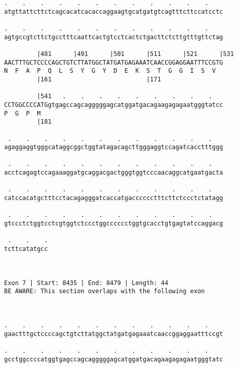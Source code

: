 \documentclass{article}
\begin{document}
\begin{Verbatim}
.    .    .    .    .    .    .    .    .    .    .    .    
atgttattcttctcagcacatcacaccaggaagtgcatgatgtcagtttcttccatcctc
                                                            
.    .    .    .    .    .    .    .    .    .    .    .    
agtgccgtcttctgcctttcaattcactgtcctcactctgacttctcttgtttgttctag
                                                            
         |481      |491      |501      |511      |521      |531
AACTTTGCTCCCCAGCTGTCTTATGGCTATGATGAGAAATCAACCGGAGGAATTTCCGTG
N  F  A  P  Q  L  S  Y  G  Y  D  E  K  S  T  G  G  I  S  V  
         |161                          |171                 
  
         |541   .    .    .    .    .    .    .    .    .   
CCTGGCCCCATGgtgagccagcagggggagcatggatgacagaagagagaatgggtatcc
P  G  P  M                                                  
         |181                                               
  
 .    .    .    .    .    .    .    .    .    .    .    .   
agaggaggtgggcataggcggctggtatagacagcttgggaggtccagatcacctttggg
                                                            
 .    .    .    .    .    .    .    .    .    .    .    .   
acctcagagtccagaaaggatgcaggacgactgggtggtcccaacaggcatgaatgacta
                                                            
 .    .    .    .    .    .    .    .    .    .    .    .   
catccacatgctttcctacagagggatcaccatgacccccctttcttctccctctatagg
                                                            
 .    .    .    .    .    .    .    .    .    .    .    .   
gtccctctggtcctcgtggtctccctggcccccctggtgcacctgtgagtatccaggacg
                                                            
 .    .    .
tcttcatatgcc
            
            
 
Exon 7 | Start: 8435 | End: 8479 | Length: 44
BE AWARE: This section overlaps with the following exon



.    .    .    .    .    .    .    .    .    .    .    .    
gaactttgctccccagctgtcttatggctatgatgagaaatcaaccggaggaatttccgt
                                                            
.    .    .    .    .    .    .    .    .    .    .    .    
gcctggccccatggtgagccagcagggggagcatggatgacagaagagagaatgggtatc
                                                            

\end{Verbatim}
\end{document}

